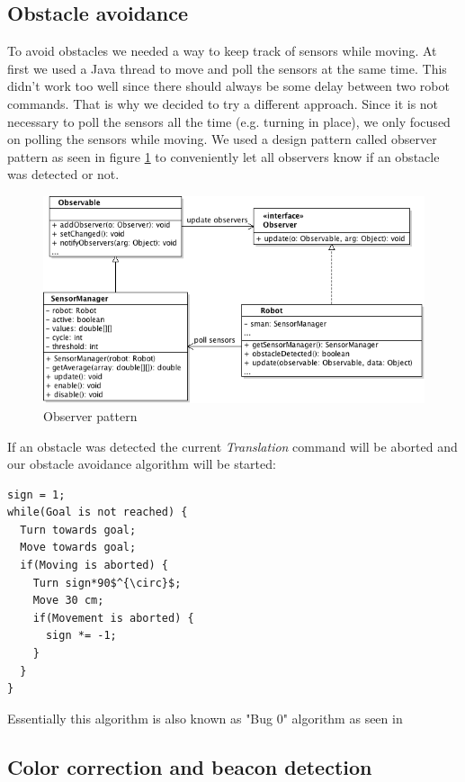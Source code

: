 \documentclass[703030]{iisreport}
\begin{document}
\subsection{Obstacle avoidance}
To avoid obstacles we needed a way to keep track of sensors while moving. At
first we used a Java thread to move and poll the sensors at the same time. This
didn't work too well since there should always be some delay between two robot
commands. That is why we decided to try a different approach. Since it is not
necessary to poll the sensors all the time (e.g. turning in place), we only
focused on polling the sensors while moving. We used a design pattern called
observer pattern as seen in figure \ref{img:observerpattern} to conveniently let
all observers know if an obstacle was detected or not.

\begin{figure}
	\centering
	\includegraphics[width=\textwidth,height=\textheight,keepaspectratio]{observerpattern.png}
	\caption{Observer pattern}
	\label{img:observerpattern}
\end{figure}

\noindent If an obstacle was detected the current \emph{Translation} command 
will be aborted and our obstacle avoidance algorithm will be started:

\begin{lstlisting}[mathescape]
sign = 1;
while(Goal is not reached) {
  Turn towards goal;
  Move towards goal;
  if(Moving is aborted) {
    Turn sign*90$^{\circ}$;
    Move 30 cm;
    if(Movement is aborted) {
      sign *= -1;
    }
  }
}
\end{lstlisting}

\noindent Essentially this algorithm is also known as "Bug 0" algorithm as seen in \citep[7]{bug-algorithms}

\subsection{Color correction and beacon detection}
\end{document}
